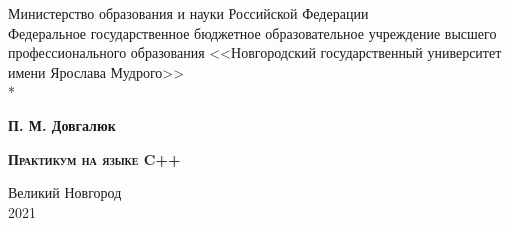 \begin{titlepage}
\newpage

\begin{center}
Министерство образования и науки Российской Федерации \\
\vspace{0.5em}
Федеральное государственное бюджетное образовательное учреждение
высшего профессионального образования
<<Новгородский государственный университет \\ имени Ярослава Мудрого>> \\*
\hrulefill
\end{center}
 
\vspace{4em}

\begin{center}
\bfseries 
\fontsize{15pt}{5pt}\selectfont 
П. М. Довгалюк
\end{center}

\vspace{0.7em}

\begin{center}
\scshape\bfseries\fontsize{20pt}{20pt}\selectfont 
Практикум на языке C++
\end{center}

 
\vspace{\fill}

\begin{center}
Великий Новгород \\ 2021
\end{center}

\end{titlepage}
